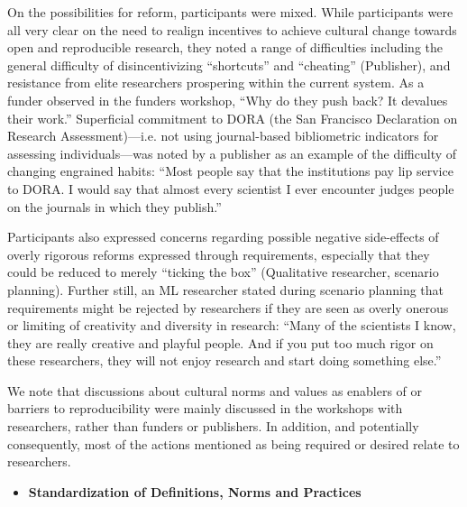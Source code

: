 \documentclass[authordate, meta]{jote-new-article}
\begin{document}
	On the possibilities for reform, participants were mixed. While participants were all very clear on the need to realign incentives to achieve cultural change towards open and reproducible research, they noted a range of difficulties including the general difficulty of disincentivizing “shortcuts” and “cheating” (Publisher), and resistance from elite researchers prospering within the current system. As a funder observed in the funders workshop, “Why do they push back? It devalues their work.” Superficial commitment to DORA (the San Francisco Declaration on Research Assessment)—i.e. not using journal-based bibliometric indicators for assessing individuals—was noted by a publisher as an example of the difficulty of changing engrained habits: “Most people say that the institutions pay lip service to DORA. I would say that almost every scientist I ever encounter judges people on the journals in which they publish.”







	Participants also expressed concerns regarding possible negative side-effects of overly rigorous reforms expressed through requirements, especially that they could be reduced to merely “ticking the box” (Qualitative researcher, scenario planning). Further still, an ML researcher stated during scenario planning that requirements might be rejected by researchers if they are seen as overly onerous or limiting of creativity and diversity in research: “Many of the scientists I know, they are really creative and playful people. And if you put too much rigor on these researchers, they will not enjoy research and start doing something else.”







	We note that discussions about cultural norms and values as enablers of or barriers to reproducibility were mainly discussed in the workshops with researchers, rather than funders or publishers. In addition, and potentially consequently, most of the actions mentioned as being required or desired relate to researchers.






\begin{itemize}[after=\vspace{-\baselineskip}]
	\item \textbf{Standardization of Definitions, Norms and Practices}
\end{itemize}
\end{document}
